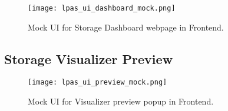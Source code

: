 \begin{figure}[h]
\centering
\texttt{[image: lpas\_ui\_dashboard\_mock.png]}
\caption{Mock UI for Storage Dashboard webpage in \lpa{} Frontend.}
\label{fig:lpas_ui_dashboard_mock}
\end{figure}

\subsection{Storage Visualizer Preview}


\begin{figure}[h]
\centering
\texttt{[image: lpas\_ui\_preview\_mock.png]}
\caption{Mock UI for Visualizer preview popup in \lpa{} Frontend.}
\label{fig:lpas_ui_preview_mock}
\end{figure}
